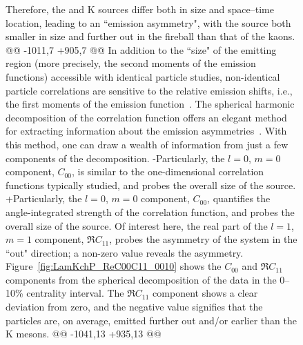 \begin{table}[htbp]
\begin{figure}[h]
{ Therefore, the \Lam and K sources differ both in size and space--time location, leading to an ``emission asymmetry", with the \Lam source both smaller in size and further out in the fireball than that of the kaons.
@@ -1011,7 +905,7 @@
 In addition to the ``size" of the emitting region (more precisely, the second moments of the emission functions) accessible with identical particle studies, non-identical particle correlations are sensitive to the relative emission shifts, i.e., the first moments of the emission function~\cite{Kisiel:2009eh}.
 The spherical harmonic decomposition of the correlation function offers an elegant method for extracting information about the emission asymmetries~\cite{Chajecki:2008vg, PhysRevC.72.054902, Kisiel:2009iw}.
 With this method, one can draw a wealth of information from just a few components of the decomposition.
-Particularly, the $l=0$, $m=0$ component, $C_{00}$, is similar to the one-dimensional correlation functions typically studied, and probes the overall size of the source.
+Particularly, the $l=0$, $m=0$ component, $C_{00}$, quantifies the angle-integrated strength of the correlation function, and probes the overall size of the source.
 Of interest here, the real part of the $l=1$, $m=1$ component, $\Re C_{11}$, probes the asymmetry of the system in the ``out" direction; a non-zero value reveals the asymmetry. 
 Figure~\ref{fig:LamKchP_ReC00C11_0010} shows the $C_{00}$ and $\Re C_{11}$ components from the spherical decomposition of the \LamKchP data in the 0--10\% centrality interval.
 The $\Re C_{11}$ component shows a clear deviation from zero, and the negative value signifies that the \Lam particles are, on average, emitted further out and/or earlier than the K mesons.
@@ -1041,13 +935,13 @@
 
}
\end{figure}
\end{table}
